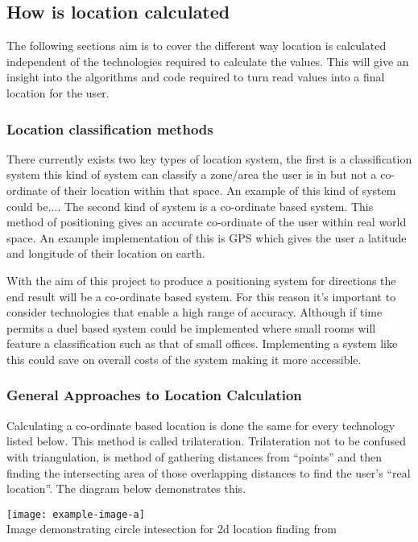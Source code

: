 \subsection{How is location calculated}
The following sections aim is to cover the different way location is calculated independent of the technologies required to calculate the values. This will give an insight into the algorithms and code required to turn read values into a final location for the user. 

\subsubsection{Location classification methods}
There currently exists two key types of location system, the first is a classification system this kind of system can classify a zone/area the user is in but not a co-ordinate of their location within that space. An example of this kind of system could be....
The second kind of system is a co-ordinate based system. This method of positioning gives an accurate co-ordinate of the user within real world space. An example implementation of this is GPS which gives the user a latitude and longitude of their location on earth.

With the aim of this project to produce a positioning system for directions the end result will be a co-ordinate based system. For this reason it's important to consider technologies that enable a high range of accuracy. Although if time permits a duel based system could be implemented where small rooms will feature a classification such as that of small offices. Implementing a system like this could save on overall costs of the system making it more accessible.

\subsubsection{General Approaches to Location Calculation}
Calculating a co-ordinate based location is done the same for every technology listed below. This method is called trilateration. Trilateration not to be confused with triangulation, is method of gathering distances from “points” and then finding the intersecting area of those overlapping distances to find the user’s “real location”. The diagram below demonstrates this.
\begin{center}
	\texttt{[image: example-image-a]}\\
	Image demonstrating circle intesection for 2d location finding from \citetemp
\end{center}

